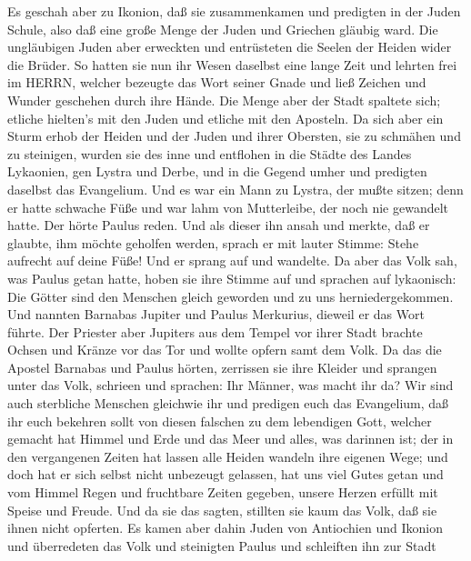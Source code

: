  Es geschah aber zu Ikonion, daß sie zusammenkamen und
predigten in der Juden Schule, also daß eine große Menge der Juden und
Griechen gläubig ward.  Die ungläubigen Juden aber erweckten
und entrüsteten die Seelen der Heiden wider die Brüder.  So
hatten sie nun ihr Wesen daselbst eine lange Zeit und lehrten frei im
HERRN, welcher bezeugte das Wort seiner Gnade und ließ Zeichen und
Wunder geschehen durch ihre Hände.  Die Menge aber der Stadt
spaltete sich; etliche hielten's mit den Juden und etliche mit den
Aposteln.  Da sich aber ein Sturm erhob der Heiden und der
Juden und ihrer Obersten, sie zu schmähen und zu steinigen, 
wurden sie des inne und entflohen in die Städte des Landes Lykaonien,
gen Lystra und Derbe, und in die Gegend umher  und predigten
daselbst das Evangelium.  Und es war ein Mann zu Lystra, der
mußte sitzen; denn er hatte schwache Füße und war lahm von Mutterleibe,
der noch nie gewandelt hatte.  Der hörte Paulus reden. Und
als dieser ihn ansah und merkte, daß er glaubte, ihm möchte geholfen
werden,  sprach er mit lauter Stimme: Stehe aufrecht auf
deine Füße! Und er sprang auf und wandelte.  Da aber das
Volk sah, was Paulus getan hatte, hoben sie ihre Stimme auf und sprachen
auf lykaonisch: Die Götter sind den Menschen gleich geworden und zu uns
herniedergekommen.  Und nannten Barnabas Jupiter und Paulus
Merkurius, dieweil er das Wort führte.  Der Priester aber
Jupiters aus dem Tempel vor ihrer Stadt brachte Ochsen und Kränze vor
das Tor und wollte opfern samt dem Volk.  Da das die
Apostel Barnabas und Paulus hörten, zerrissen sie ihre Kleider und
sprangen unter das Volk, schrieen  und sprachen: Ihr
Männer, was macht ihr da? Wir sind auch sterbliche Menschen gleichwie
ihr und predigen euch das Evangelium, daß ihr euch bekehren sollt von
diesen falschen zu dem lebendigen Gott, welcher gemacht hat Himmel und
Erde und das Meer und alles, was darinnen ist;  der in den
vergangenen Zeiten hat lassen alle Heiden wandeln ihre eigenen Wege;
 und doch hat er sich selbst nicht unbezeugt gelassen, hat
uns viel Gutes getan und vom Himmel Regen und fruchtbare Zeiten gegeben,
unsere Herzen erfüllt mit Speise und Freude.  Und da sie
das sagten, stillten sie kaum das Volk, daß sie ihnen nicht opferten.
 Es kamen aber dahin Juden von Antiochien und Ikonion und
überredeten das Volk und steinigten Paulus und schleiften ihn zur Stadt
